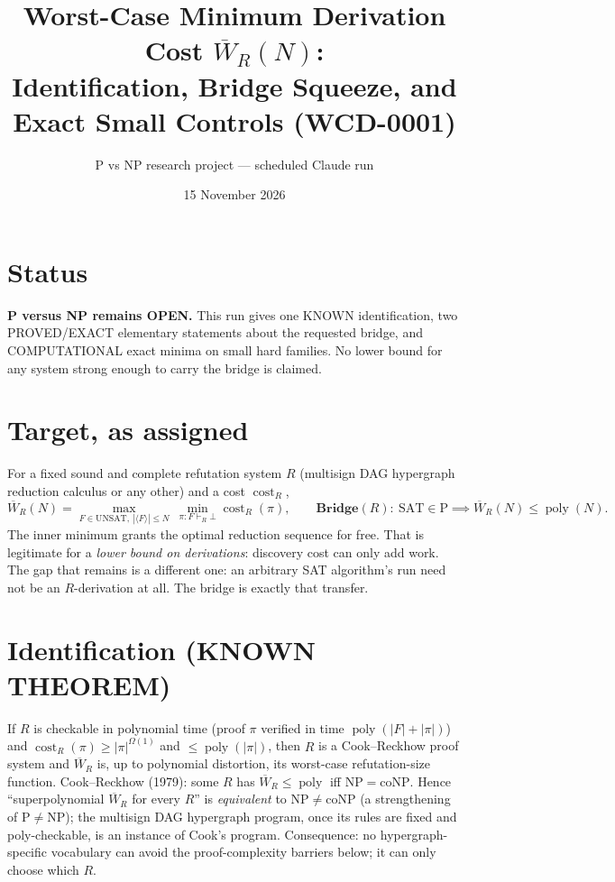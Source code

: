 \documentclass[11pt]{article}
\title{Worst-Case Minimum Derivation Cost $\overline W_R(N)$:\\
Identification, Bridge Squeeze, and Exact Small Controls (WCD-0001)}
\author{P vs NP research project --- scheduled Claude run}
\date{15 November 2026}
\newcommand{\UNSAT}{\mathrm{UNSAT}}\newcommand{\SAT}{\mathrm{SAT}}
\newcommand{\poly}{\operatorname{poly}}
\begin{document}
\maketitle

\section*{Status}
\textbf{P versus NP remains OPEN.} This run gives one KNOWN identification,
two PROVED/EXACT elementary statements about the requested bridge, and
COMPUTATIONAL exact minima on small hard families. No lower bound for any
system strong enough to carry the bridge is claimed.

\section{Target, as assigned}
For a fixed sound and complete refutation system $R$ (multisign DAG hypergraph
reduction calculus or any other) and a cost $\operatorname{cost}_R$,
\[
\overline W_R(N)=\max_{F\in\UNSAT,\ |\langle F\rangle|\le N}\
\min_{\pi:F\vdash_R\bot}\operatorname{cost}_R(\pi),\qquad
\textbf{Bridge}(R):\ \SAT\in\mathrm P\implies \overline W_R(N)\le\poly(N).
\]
The inner minimum grants the optimal reduction sequence for free. That is
legitimate for a \emph{lower bound on derivations}: discovery cost can only add
work. The gap that remains is a different one: an arbitrary SAT algorithm's run
need not be an $R$-derivation at all. The bridge is exactly that transfer.

\section{Identification (KNOWN THEOREM)}
If $R$ is checkable in polynomial time (proof $\pi$ verified in time
$\poly(|F|+|\pi|)$) and $\operatorname{cost}_R(\pi)\ge|\pi|^{\Omega(1)}$ and
$\le\poly(|\pi|)$, then $R$ is a Cook--Reckhow proof system and
$\overline W_R$ is, up to polynomial distortion, its worst-case refutation-size
function. Cook--Reckhow (1979): some $R$ has $\overline W_R\le\poly$ iff
$\mathrm{NP}=\mathrm{coNP}$. Hence ``superpolynomial $\overline W_R$ for every
$R$'' is \emph{equivalent} to $\mathrm{NP}\ne\mathrm{coNP}$ (a strengthening of
$\mathrm P\ne\mathrm{NP}$); the multisign DAG hypergraph program, once its
rules are fixed and poly-checkable, is an instance of Cook's program.
Consequence: no hypergraph-specific vocabulary can avoid the proof-complexity
barriers below; it can only choose which $R$.
\end{document}
